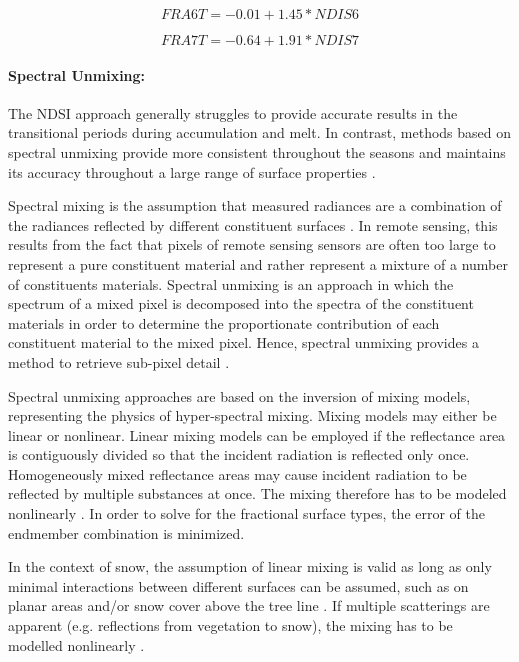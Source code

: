 \documentclass[letterpaper, parskip=half]{scrartcl}
\begin{document}
\begin{equation}
    FRA6T = -0.01 + 1.45 * NDIS6
\end{equation}

\begin{equation}
    FRA7T = -0.64 + 1.91 * NDIS7
\end{equation}

\paragraph{Spectral Unmixing:}
The \gls{NDSI} approach generally struggles to provide accurate results in the transitional periods during accumulation and melt. In contrast, methods based on spectral unmixing provide more consistent throughout the seasons and maintains its accuracy throughout a large range of surface properties \citep{Rittger2013}.

Spectral mixing is the assumption that measured radiances are a combination of the radiances reflected by different constituent surfaces \citep{Dozier2004}.
In remote sensing, this results from the fact that pixels of remote sensing sensors are often too large to represent a pure constituent material and rather represent a mixture of a number of constituents materials. Spectral unmixing is an approach in which the spectrum of a mixed pixel is decomposed into the spectra of the constituent materials in order to determine the proportionate contribution of each constituent material to the mixed pixel. Hence, spectral unmixing provides a method to retrieve sub-pixel detail \citep{Keshava2003}.

Spectral unmixing approaches are based on the inversion of mixing models, representing the physics of hyper-spectral mixing. Mixing models may either be linear or nonlinear. Linear mixing models can be employed if the reflectance area is contiguously divided so that the incident radiation is reflected only once. Homogeneously mixed reflectance areas may cause incident radiation to be reflected by multiple substances at once. The mixing therefore has to be modeled nonlinearly \citep{Keshava2003}.
In order to solve for the fractional surface types, the error of the endmember combination is minimized.

In the context of snow, the assumption of linear mixing is valid as long as only minimal interactions between different surfaces can be assumed, such as on planar areas and/or snow cover above the tree line \citep{Painter2009, Dozier2004}. If multiple scatterings are apparent (e.g. reflections from vegetation to snow), the mixing has to be modelled nonlinearly \citep{Roberts1993}.
\end{document}
